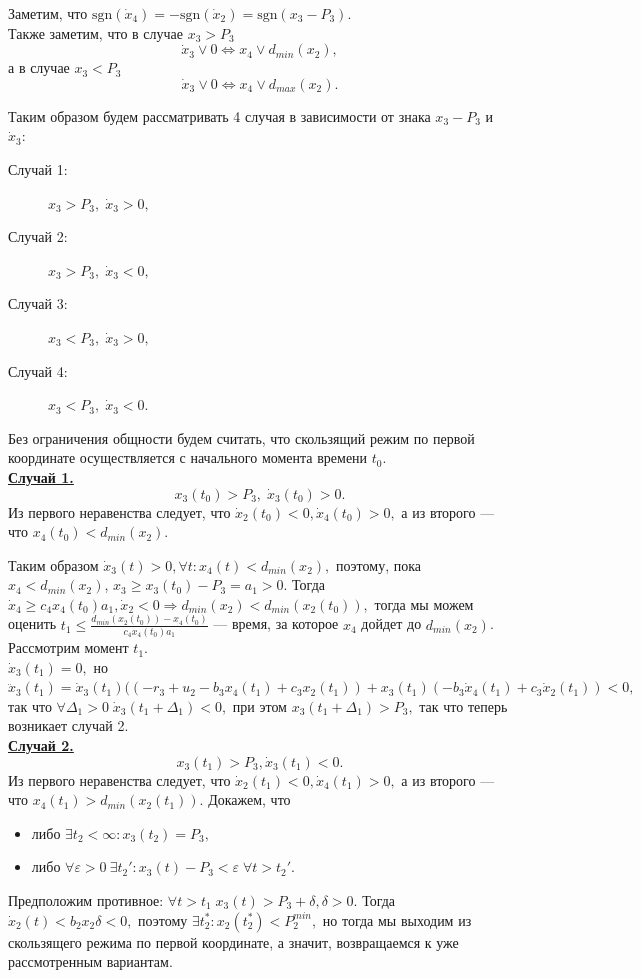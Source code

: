 \documentclass[11pt]{article}
\begin{document}
Заметим, что $\text{sgn}(\dot x_4) = -\text{sgn}(\dot x_2) = \text{sgn}(x_3 - P_3).$ \\
Также заметим, что в случае $x_3 > P_3$ $$\dot x_3 \vee 0 \Leftrightarrow x_4 \vee d_{min}(x_2),$$ а в случае $x_3 < P_3$ $$\dot x_3 \vee 0 \Leftrightarrow x_4 \vee d_{max}(x_2).$$

Таким образом будем рассматривать 4 случая в зависимости от знака $x_3 - P_3$ и $\dot x_3:$


\begin{description}
	\item[Случай 1:] $x_3 > P_3, \; \dot x_3 > 0,$
	\item[Случай 2:] $x_3 > P_3, \; \dot x_3 < 0,$
	\item[Случай 3:] $x_3 < P_3, \; \dot x_3 > 0,$
	\item[Случай 4:] $x_3 < P_3, \; \dot x_3 < 0.$
\end{description}

Без ограничения общности будем считать, что скользящий режим по первой координате осуществляется с начального момента времени $t_0$.\\

\underline {\bf Случай 1.} 
$$x_3(t_0) > P_3, \; \dot x_3(t_0) > 0.$$
Из первого неравенства следует, что $\dot x_2(t_0) < 0, \dot x_4(t_0) > 0,$ а из второго --- что $x_4(t_0) < d_{min}(x_2).$

Таким образом $\dot x_3(t) > 0, \forall t : x_4(t) < d_{min}(x_2),$ поэтому, пока $x_4 < d_{min}(x_2)$, $ x_3 \geqslant x_3(t_0) - P_3 = a_1 > 0.$ Тогда $\dot x_4 \geqslant c_4x_4(t_0)a_1, \dot x_2 < 0 \Rightarrow d_{min}(x_2) < d_{min}(x_2(t_0)),$ тогда мы можем оценить $t_1 \leqslant \frac{d_{min}(x_2(t_0)) - x_4(t_0)}{c_4x_4(t_0)a_1}$ --- время, за которое $x_4$ дойдет до $d_{min}(x_2)$.\\
Рассмотрим момент $t_1.$ \\
$\dot x_3(t_1) = 0,$ но $\ddot x_3(t_1) = \dot x_3(t_1)((-r_3 + u_2 - b_3x_4(t_1) + c_3x_2(t_1)) + x_3(t_1)(-b_3\dot x_4(t_1) + c_3 \dot x_2(t_1)) < 0,$ так что $\forall \Delta_1 > 0 \; \dot x_3(t_1 + \Delta_1) < 0,$ при этом $x_3(t_1 + \Delta_1) > P_3,$ так что теперь возникает случай 2.\\

\underline{\bf Случай 2.}
$$x_3(t_1) > P_3, \dot x_3(t_1) < 0.$$
Из первого неравенства следует, что $\dot x_2(t_1) < 0, \dot x_4(t_1) > 0,$ а из второго --- что $x_4(t_1) > d_{min}(x_2(t_1)).$ Докажем, что 
\begin{itemize}
	\item либо $\exists t_2 < \infty:  x_3(t_2) = P_3,$
	\item либо $\forall \varepsilon > 0 \: \exists t_2' : x_3(t) - P_3 < \varepsilon \; \forall t > t_2'.$
\end{itemize}
Предположим противное: $\forall t > t_1 \; x_3(t) > P_3 + \delta, \delta > 0.$ Тогда $\dot x_2(t) < b_2x_2\delta < 0,$ поэтому $\exists t_2^* : x_2(t_2^*) < P_2^{min},$ но тогда мы выходим из скользящего режима по первой координате, а значит, возвращаемся к уже рассмотренным вариантам.
\end{document}
